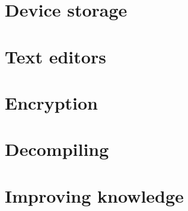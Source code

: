 \documentclass[oneside]{book}
\begin{document}
\part{Device storage}

\part{Text editors}



\part{Encryption}



\part{Decompiling}



\part{Improving knowledge}


\end{document}
